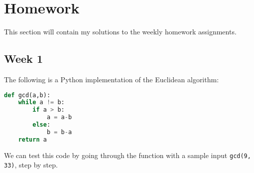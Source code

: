 \documentclass{article}
\theoremstyle{theorem}
\theoremstyle{definition}
\theoremstyle{remark}
\begin{document}
\section{Homework}\label{homework}

This section will contain my solutions to the weekly homework assignments. 

\subsection{Week 1}

The following is a Python implementation of the Euclidean algorithm:

\begin{lstlisting}[language=Python]
def gcd(a,b):
    while a != b:
        if a > b:
            a = a-b
        else:
            b = b-a
    return a
\end{lstlisting}

\newpage %

\noindent We can test this code by going through the function with a sample input \texttt{gcd(9, 33)}, step by step.
\end{document}
